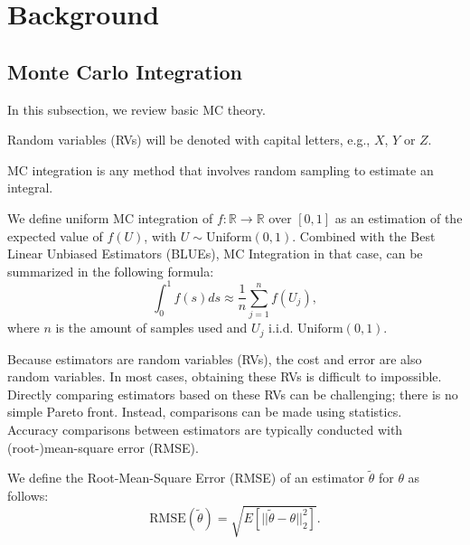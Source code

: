 \documentclass[a4paper,12pt]{article}
\begin{document}
\section{Background}

\subsection{Monte Carlo Integration}

In this subsection, we review basic MC theory. \\

\begin{notation}
  Random variables (RVs) will be denoted with capital letters, e.g., $X$, $Y$ or $Z$.
\end{notation}


MC integration is any method that involves random sampling to
estimate an integral.
\begin{definition}
  We define uniform MC integration of
  $f:\mathbb{R} \rightarrow \mathbb{R}$
  over $[0,1]$ as
  an estimation of the expected value of $f(U)$, with
  $U \sim \text{Uniform}(0,1)$. Combined
  with the Best Linear Unbiased Estimators (BLUEs), MC Integration
  in that case, can be summarized in the following formula:
  \begin{equation}\label{eq:BLUE}
    \int_{0}^1 f(s)ds \approx \frac{1}{n} \sum_{j=1}^{n}f(U_{j}),
  \end{equation}
  where $n$ is the amount of samples used and $U_{j}$ i.i.d. $\text{Uniform}(0,1)$.
\end{definition}

Because estimators are random variables (RVs), the cost and error are also random
variables. In most cases, obtaining these RVs is difficult to impossible.
Directly comparing estimators based on these RVs can be challenging;
there is no simple Pareto front. Instead, comparisons can be made
using statistics. \\

Accuracy comparisons between estimators
are typically conducted with (root-)mean-square error (RMSE).
\begin{definition}
  We define the Root-Mean-Square Error (RMSE) of an estimator $\tilde{\theta}$ for $\theta$  as follows:
  \begin{equation}
    \text{RMSE}(\tilde{\theta}) = \sqrt{E[||\tilde{\theta}-\theta||^{2}_{2}]}.
  \end{equation}
\end{definition}
\end{document}
